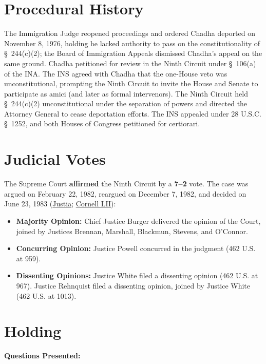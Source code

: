\documentclass[12pt]{article}
\begin{document}
\section{Procedural History}
The Immigration Judge reopened proceedings and ordered Chadha deported on November 8, 1976, holding he lacked authority to pass on the constitutionality of \S~244(c)(2); the Board of Immigration Appeals dismissed Chadha's appeal on the same ground. Chadha petitioned for review in the Ninth Circuit under \S~106(a) of the INA. The INS agreed with Chadha that the one-House veto was unconstitutional, prompting the Ninth Circuit to invite the House and Senate to participate as amici (and later as formal intervenors). The Ninth Circuit held \S~244(c)(2) unconstitutional under the separation of powers and directed the Attorney General to cease deportation efforts. The INS appealed under 28 U.S.C. \S~1252, and both Houses of Congress petitioned for certiorari.

\section{Judicial Votes}
The Supreme Court \textbf{affirmed} the Ninth Circuit by a \textbf{7--2} vote. The case was argued on February 22, 1982, reargued on December 7, 1982, and decided on June 23, 1983 (\href{https://supreme.justia.com/cases/federal/us/462/919/}{Justia}; \href{https://www.law.cornell.edu/supremecourt/text/462/919}{Cornell LII}):

\begin{itemize}
    \item \textbf{Majority Opinion:} Chief Justice Burger delivered the opinion of the Court, joined by Justices Brennan, Marshall, Blackmun, Stevens, and O'Connor.
    \item \textbf{Concurring Opinion:} Justice Powell concurred in the judgment (462 U.S. at 959).
    \item \textbf{Dissenting Opinions:} Justice White filed a dissenting opinion (462 U.S. at 967). Justice Rehnquist filed a dissenting opinion, joined by Justice White (462 U.S. at 1013).
\end{itemize}

\section{Holding}
\textbf{Questions Presented:}
\end{document}
